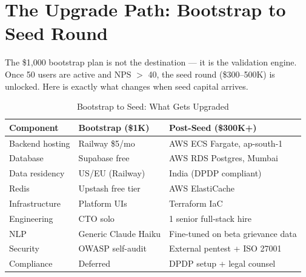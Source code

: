 \documentclass[12pt, a4paper]{article}
\begin{document}
\section{The Upgrade Path: Bootstrap to Seed Round}

The \$1,000 bootstrap plan is not the destination --- it is the validation engine.
Once 50 users are active and NPS $>$ 40, the seed round (\$300--500K) is unlocked.
Here is exactly what changes when seed capital arrives.

\begin{table}[ht]
\centering
\caption{Bootstrap to Seed: What Gets Upgraded}
\renewcommand{\arraystretch}{1.4}
\begin{tabularx}{\textwidth}{X p{3.5cm} p{3.5cm}}
\toprule
\rowcolor{pollitylightblue}
\textbf{Component} & \textbf{Bootstrap (\$1K)} & \textbf{Post-Seed (\$300K+)} \\
\midrule
Backend hosting       & Railway \$5/mo                  & AWS ECS Fargate, ap-south-1 \\
Database              & Supabase free                   & AWS RDS Postgres, Mumbai \\
Data residency        & US/EU (Railway)                 & India (DPDP compliant) \\
Redis                 & Upstash free tier               & AWS ElastiCache \\
Infrastructure        & Platform UIs                    & Terraform IaC \\
Engineering           & CTO solo                        & 1 senior full-stack hire \\
NLP                   & Generic Claude Haiku            & Fine-tuned on beta grievance data \\
Security              & OWASP self-audit                & External pentest + ISO 27001 \\
Compliance            & Deferred                        & DPDP setup + legal counsel \\
\bottomrule
\end{tabularx}
\end{table}

\vspace{1em}
\end{document}
